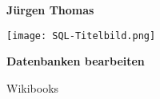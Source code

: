 \begin{LARGE}
\begin{center}
\textbf{\Huge Jürgen Thomas} \bigskip

\parbox[t]{1.0\linewidth}{
\texttt{[image: SQL-Titelbild.png]}
}\vspace{0.75cm}

\textbf{\Huge Datenbanken bearbeiten} \bigskip

\begin{shaded}
Wikibooks \\
\end{shaded}

\end{center}
\end{LARGE}